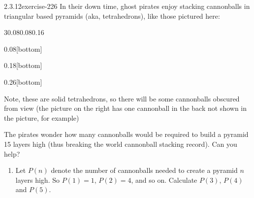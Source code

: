 \documentclass[twoside,11pt,]{book}
\numberwithin{equation}{chapter}
\begin{document}
\begin{divisionsolution}{2.3.12}{}{exercise-226}%
\hypertarget{p-3360}{}%
In their down time, ghost pirates enjoy stacking cannonballs in triangular based pyramids (aka, tetrahedrons), like those pictured here:%
\begin{sidebyside}{3}{0.08}{0.08}{0.16}%
\begin{sbspanel}{0.08}[bottom]%
\end{sbspanel}%
\begin{sbspanel}{0.18}[bottom]%
\end{sbspanel}%
\begin{sbspanel}{0.26}[bottom]%
\end{sbspanel}%
\end{sidebyside}%
\par
\hypertarget{p-3361}{}%
Note, these are solid tetrahedrons, so there will be some cannonballs obscured from view (the picture on the right has one cannonball in the back not shown in the picture, for example)%
\par
\hypertarget{p-3362}{}%
The pirates wonder how many cannonballs would be required to build a pyramid 15 layers high (thus breaking the world cannonball stacking record). Can you help?\leavevmode%
\begin{enumerate}[label=(\alph*)]
\item\hypertarget{li-1933}{}\hypertarget{p-3363}{}%
Let \(P(n)\) denote the number of cannonballs needed to create a pyramid \(n\) layers high. So \(P(1) = 1\), \(P(2) = 4\), and so on. Calculate \(P(3)\), \(P(4)\) and \(P(5)\). %

\end{enumerate}
\end{divisionsolution}
\end{document}
